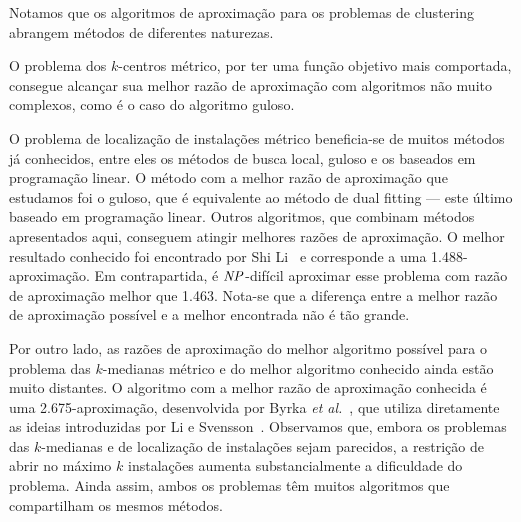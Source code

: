 \documentclass[12pt]{article}
\begin{document}


Notamos que os algoritmos de aproximação para os problemas de clustering abrangem métodos de diferentes naturezas.

O problema dos $k$-centros métrico, por ter uma função objetivo mais comportada, consegue alcançar sua melhor razão de aproximação com algoritmos não muito complexos, como é o caso do algoritmo guloso.

O problema de localização de instalações métrico beneficia-se de muitos métodos já conhecidos, entre eles os métodos de busca local, guloso e os baseados em programação linear. O método com a melhor razão de aproximação que estudamos foi o guloso, que é equivalente ao método de dual fitting --- este último baseado em programação linear. Outros algoritmos, que combinam métodos apresentados aqui, conseguem atingir melhores razões de aproximação. O melhor resultado conhecido foi encontrado por Shi Li~\cite{LI'13} e corresponde a uma 1.488-aproximação. Em contrapartida, é $\mathit{NP}$-difícil aproximar esse problema com razão de aproximação melhor que 1.463. Nota-se que a diferença entre a melhor razão de aproximação possível e a melhor encontrada não é tão grande.

Por outro lado, as razões de aproximação do melhor algoritmo possível para o problema das $k$-medianas métrico e do melhor algoritmo conhecido ainda estão muito distantes. O algoritmo com a melhor razão de aproximação conhecida é uma 2.675-aproximação, desenvolvida por Byrka \emph{et al.}~\cite{BPRST'17}, que utiliza diretamente as ideias introduzidas por Li e Svensson~\cite{li2012}. Observamos que, embora os problemas das $k$-medianas e de localização de instalações sejam parecidos, a restrição de abrir no máximo $k$ instalações aumenta substancialmente a dificuldade do problema. Ainda assim, ambos os problemas têm muitos algoritmos que compartilham os mesmos métodos.
\newpage


\end{document}
